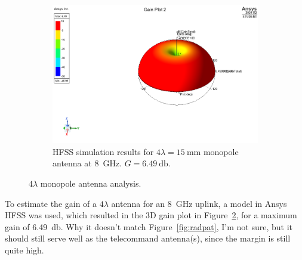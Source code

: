 \documentclass[9pt]{article}
\begin{document}
\begin{figure}[h]
\begin{subfigure}{.35\textwidth}
    \includegraphics[width=\textwidth]{4lambda_monopole_antenna_gain}
    \caption{HFSS simulation results for $4\lambda=\qty{15}{\milli\meter}$ monopole antenna at \qty{8}{\giga\hertz}. $G=\qty{6.49}{\decibel}$.}
    \label{fig:hfss}
  \end{subfigure}
  \caption{$4\lambda$ monopole antenna analysis.}
\end{figure}
 
To estimate the gain of a $4\lambda$ antenna for an \qty{8}{\giga\hertz} uplink, a model in Ansys HFSS was used, which resulted in the 3D gain plot in Figure~\ref{fig:hfss}, for a maximum gain of \qty{6.49}{\decibel}.
Why it doesn't match Figure~\ref{fig:radpat}, I'm not sure, but it should still serve well as the telecommand antenna(s), since the margin is still quite high.
\end{document}

